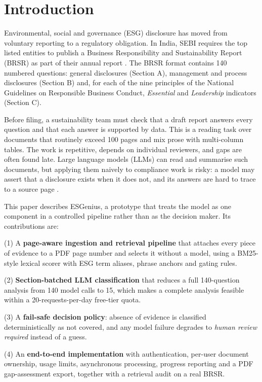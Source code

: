 \documentclass[conference]{IEEEtran}
\begin{document}
\section{Introduction}
Environmental, social and governance (ESG) disclosure has moved from voluntary reporting to a regulatory obligation. In India, SEBI requires the top listed entities to publish a Business Responsibility and Sustainability Report (BRSR) as part of their annual report \cite{b1}. The BRSR format contains 140 numbered questions: general disclosures (Section A), management and process disclosures (Section B) and, for each of the nine principles of the National Guidelines on Responsible Business Conduct, \textit{Essential} and \textit{Leadership} indicators (Section C).

Before filing, a sustainability team must check that a draft report answers every question and that each answer is supported by data. This is a reading task over documents that routinely exceed 100 pages and mix prose with multi-column tables. The work is repetitive, depends on individual reviewers, and gaps are often found late. Large language models (LLMs) can read and summarise such documents, but applying them naively to compliance work is risky: a model may assert that a disclosure exists when it does not, and its answers are hard to trace to a source page \cite{b10}.

This paper describes ESGenius, a prototype that treats the model as one component in a controlled pipeline rather than as the decision maker. Its contributions are:

(1) A \textbf{page-aware ingestion and retrieval pipeline} that attaches every piece of evidence to a PDF page number and selects it without a model, using a BM25-style lexical scorer \cite{b2} with ESG term aliases, phrase anchors and gating rules.

(2) \textbf{Section-batched LLM classification} that reduces a full 140-question analysis from 140 model calls to 15, which makes a complete analysis feasible within a 20-requests-per-day free-tier quota.

(3) A \textbf{fail-safe decision policy}: absence of evidence is classified deterministically as not covered, and any model failure degrades to \textit{human review required} instead of a guess.

(4) An \textbf{end-to-end implementation} with authentication, per-user document ownership, usage limits, asynchronous processing, progress reporting and a PDF gap-assessment export, together with a retrieval audit on a real BRSR.
\end{document}
